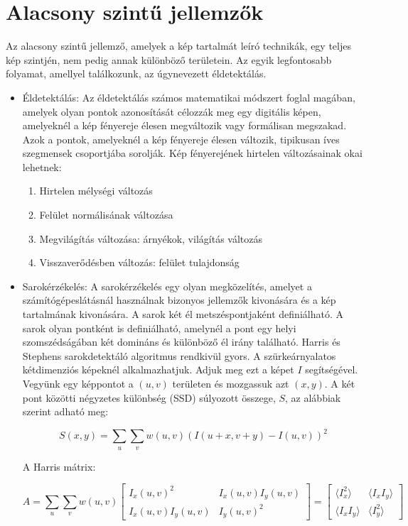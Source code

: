 \section{Alacsony szintű jellemzők}
Az alacsony szintű jellemző\cite{features27:online}, amelyek a kép tartalmát leíró technikák, egy teljes kép szintjén, nem pedig annak különböző területein. Az egyik legfontosabb folyamat, amellyel találkozunk, az úgynevezett éldetektálás.
\begin{itemize}
\item Éldetektálás: Az éldetektálás számos matematikai módszert foglal magában, amelyek olyan pontok azonosítását célozzák meg egy digitális képen, amelyeknél a kép fényereje élesen megváltozik vagy formálisan megszakad. Azok a pontok, amelyeknél a kép fényereje élesen változik, tipikusan íves szegmensek csoportjába sorolják.
Kép fényerejének hirtelen változásainak okai lehetnek:
\begin{enumerate}
\item Hirtelen mélységi változás
\item Felület normálisának változása
\item Megvilágítás változása: árnyékok, világítás változás
\item Visszaverődésben változás: felület tulajdonság
\end{enumerate}
\item Sarokérzékelés: A sarokérzékelés egy olyan megközelítés, amelyet a számítógépeslátásnál használnak bizonyos jellemzők kivonására és a kép tartalmának kivonására.
A sarok két él metszéspontjaként definiálható. A sarok olyan pontként is definiálható, amelynél a pont egy helyi szomszédságában két domináns és különböző él irány található.
Harris és Stephens sarokdetektáló algoritmus rendkivül gyors. A szürkeárnyalatos kétdimenziós képeknél alkalmazhatjuk. Adjuk meg ezt a képet $I$ segítségével. Vegyünk egy képpontot a $(u, v)$ területen és mozgassuk azt $(x, y)$. A két pont közötti négyzetes különbség (SSD) súlyozott összege, $S$, az alábbiak szerint adható meg:

$$
S(x,y)=\sum_{u}\sum_{v}w(u,v)(I(u+x,v+y)-I(u,v))^{2}
$$

A Harris mátrix:

$$
{\displaystyle A=\sum _{u}\sum _{v}w(u,v){\begin{bmatrix}I_{x}(u,v)^{2}&I_{x}(u,v)I_{y}(u,v)\\I_{x}(u,v)I_{y}(u,v)&I_{y}(u,v)^{2}\end{bmatrix}}={\begin{bmatrix}\langle I_{x}^{2}\rangle &\langle I_{x}I_{y}\rangle \\\langle I_{x}I_{y}\rangle &\langle I_{y}^{2}\rangle \end{bmatrix}}}
$$


\end{itemize}
